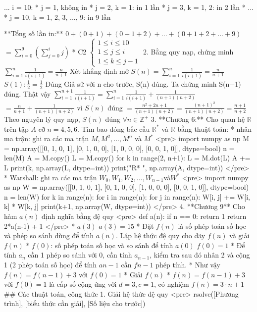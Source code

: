     ...
    i = 10:
    * j = 1, không in
    * j = 2, k = 1: in 1 lần    
    * j = 3, k = 1, 2: in 2 lần
    * ...
    * j = 10, k = 1, 2, 3, ..., 9: in 9 lần

    **Tổng số lần in:** $0 + (0 + 1) + (0 + 1 + 2) + ... + (0 + 1 + 2 + ... + 9)$
    $= \displaystyle \sum_{i=0}^{9} (\displaystyle \sum_{j = 0}^{i}j)$
* C2
$\begin{cases}
    1 \leq i \leq 10 \\
    1 \leq j \leq i \\
    1 \leq k \leq j-1
\end{cases}$
2. Bằng quy nạp, chứng minh $\displaystyle \sum_{i=1}^n\frac{1}{i(i+1)} = \frac{n}{n+1}$
Xét khẳng định mở $S(n) = \displaystyle \sum_{i=1}^n\frac{1}{i(i+1)} = \frac{n}{n+1}$
$S(1): \frac{1}{2}=\frac{1}{2}$ Đúng
Giả sử với n cho trước, S(n) đúng. Ta chứng minh S(n+1) đúng. Thật vậy
$\displaystyle \sum_{i=1}^{n+1}\frac{1}{i(i+1)} = \displaystyle \sum_{i=1}^n\frac{1}{i(i+1)} + \frac{1}{(n+1)(n+2)}$
$=\frac{n}{n+1} + \frac{1}{(n+1)(n+2)}$ vì $S(n)$ đúng
$= \frac{n^2+2n+1}{(n+1)(n+2)}=\frac{(n+1)^2}{(n+1)(n+2)}=\frac{n+1}{n+2}$
Theo nguyên lý quy nạp, $S(n)$ đúng $\forall n \in \mathbb{Z^+}$
3. **Chương 6:** Cho quan hệ $\mathbb{R}$ trên tập $A$ cỡ $n=4,5,6$. Tìm bao đóng bắc cầu $\mathbb{R^*}$ và $\mathbb{R}$ bằng thuật toán:
    * nhân ma trận: ghi ra các ma trận $M, M^2,...,M^n$ và $M^*$
    <pre>
    import numpy as np 
    M = np.array([[0, 1, 0, 1], 
              [0, 1, 0, 0],
              [1, 0, 0, 0],
              [0, 0, 1, 0]], dtype=bool)
    n = len(M)
    A = M.copy()
    L = M.copy()
    for k in range(2, n+1):
        L = M.dot(L)
        A += L
        print(k, np.array(L, dtype=int))
    print("R* ", np.array(A, dtype=int))
    </pre>
    * Warshall: ghi ra các ma trận $W_0,W_1,W_2,...,W_{n-1}$và$W^*$
    <pre>
    import numpy as np 
    W = np.array([[0, 1, 0, 1], 
              [0, 1, 0, 0],
              [1, 0, 0, 0],
              [0, 0, 1, 0]], dtype=bool)
    n = len(W)
    for k in range(n):
        for i in range(n):
            for j in range(n):
                W[i, j] += W[i, k] * W[k, j]
        print(k+1, np.array(W, dtype=int))
    </pre>
4. **Chương 9** Cho hàm $a(n)$ định nghĩa bằng đệ quy 
    <pre>
    def a(n):
        if n == 0:
            return 1
        return 2*a(n-1) + 1
    </pre>
    * $a(3)$
        $a(3) =15$
    * Đặt $f(n)$ là số phép toán số học và phép so sánh dùng để tính $a(n)$. Lập hệ thức đệ quy cho dãy $f(n)$ và giải $f(n)$    
        * $f(0)$: số phép toán số học và so sánh để tính $a(0)$
        $f(0)=1$
        * Để tính $a_n$ cần 1 phép so sánh với 0, cần tính $a_{n-1}$, kiểm tra  sau đó nhân 2 và cộng 1 (2 phép toán số học) để tính $a{n-1}$ cần $f{n-1}$ phép tính.
        * Như vậy $f(n)=f(n-1)+3$ với $f(0) = 1$
    * Giải $f(n)$
        * $f(n) = f(n-1)+3$ với $f(0) =1$ là cấp số cộng ứng với $d = 3 , c = 1$, có nghiệm $f(n)=3\cdot n+1$ 
## Các thuật toán, công thức
1. Giải hệ thức đệ quy
    <pre>
    rsolve([Phương trình], [biểu thức cần giải], [Số liệu cho trước])
    

